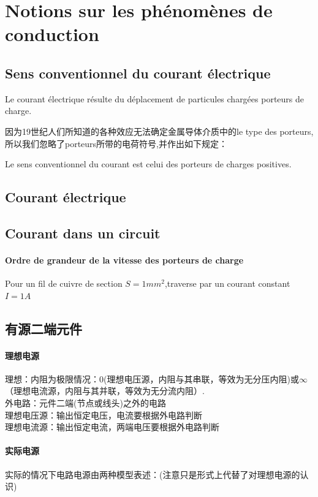 \documentclass[12pt]{book}
\theoremstyle{definition}\newtheorem{dfn}{Définition}[chapter]
\theoremstyle{plain}\newtheorem{thm}{Théorème}[chapter]
\theoremstyle{plain}\newtheorem{prp}{Proposition}[chapter]
\theoremstyle{plain}\newtheorem{lem}{\bf Lemme}[chapter]
\theoremstyle{plain}\newtheorem{axm}{\bf Axiome}[chapter]
\theoremstyle{plain}\newtheorem{lmm}{\bf Lemme}[chapter]
\theoremstyle{plain}\newtheorem{cor}{\bf Corollaire}[chapter]
\theoremstyle{remark}\newtheorem{rem}{Remarque}[chapter]
\begin{document}
	\section{Notions sur les phénomènes de conduction}
	\subsection{Sens conventionnel du courant électrique}
	Le courant électrique résulte du déplacement de particules chargées {\color{red} porteurs de charge}. 
	
	因为19世纪人们所知道的各种效应无法确定金属导体介质中的le type des porteurs,所以我们忽略了porteurs所带的电荷符号,并作出如下规定：
	
	
	Le sens conventionnel du courant est celui des porteurs de charges positives.

        
	\subsection{Courant électrique}
	\subsection{Courant dans un circuit}
	\paragraph{Ordre de grandeur de la vitesse des porteurs de charge}
	Pour un fil de cuivre de section $S=1mm^2$,traverse par un courant constant $I=1A$

\subsection{有源二端元件}
\paragraph{理想电源}理想：内阻为极限情况：$0$(理想电压源，内阻与其串联，等效为无分压内阻)或$\infty$（理想电流源，内阻与其并联，等效为无分流内阻）.
\\外电路：元件二端(节点或线头)之外的电路\\
理想电压源：输出恒定电压，电流要根据外电路判断
\\理想电流源：输出恒定电流，两端电压要根据外电路判断
\paragraph{实际电源}实际的情况下电路电源由两种模型表述：(注意只是形式上代替了对理想电源的认识)
\end{document}
